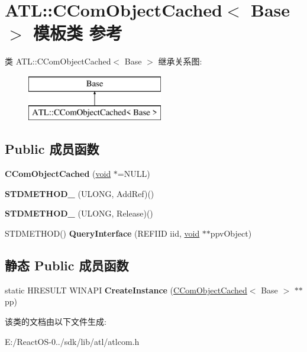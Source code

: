 \hypertarget{class_a_t_l_1_1_c_com_object_cached}{}\section{A\+TL\+:\+:C\+Com\+Object\+Cached$<$ Base $>$ 模板类 参考}
\label{class_a_t_l_1_1_c_com_object_cached}
类 A\+TL\+:\+:C\+Com\+Object\+Cached$<$ Base $>$ 继承关系图\+:\begin{figure}[H]
\begin{center}
\leavevmode
\includegraphics[height=2.000000cm]{class_a_t_l_1_1_c_com_object_cached}
\end{center}
\end{figure}
\subsection*{Public 成员函数}
\begin{DoxyCompactItemize}
\item 
\mbox{\label{class_a_t_l_1_1_c_com_object_cached_ab1a135fc4223e9664c22537138d6c3f1}} 
{\bfseries C\+Com\+Object\+Cached} (\hyperlink{interfacevoid}{void} $\ast$=N\+U\+LL)
\item 
\mbox{\label{class_a_t_l_1_1_c_com_object_cached_a58f352e490691bca9d028a63a22572ce}} 
{\bfseries S\+T\+D\+M\+E\+T\+H\+O\+D\+\_\+} (U\+L\+O\+NG, Add\+Ref)()
\item 
\mbox{\label{class_a_t_l_1_1_c_com_object_cached_ae89000d8a31f0e179b44484a43d38dfb}} 
{\bfseries S\+T\+D\+M\+E\+T\+H\+O\+D\+\_\+} (U\+L\+O\+NG, Release)()
\item 
\mbox{\label{class_a_t_l_1_1_c_com_object_cached_af9397caafce8428e720c1c25bd14fc8b}} 
S\+T\+D\+M\+E\+T\+H\+OD() {\bfseries Query\+Interface} (R\+E\+F\+I\+ID iid, \hyperlink{interfacevoid}{void} $\ast$$\ast$ppv\+Object)
\end{DoxyCompactItemize}
\subsection*{静态 Public 成员函数}
\begin{DoxyCompactItemize}
\item 
\mbox{\label{class_a_t_l_1_1_c_com_object_cached_a2d4edf91fe275ca6bafb6a1d0f646ef4}} 
static H\+R\+E\+S\+U\+LT W\+I\+N\+A\+PI {\bfseries Create\+Instance} (\hyperlink{class_a_t_l_1_1_c_com_object_cached}{C\+Com\+Object\+Cached}$<$ Base $>$ $\ast$$\ast$pp)
\end{DoxyCompactItemize}


该类的文档由以下文件生成\+:\begin{DoxyCompactItemize}
\item 
E\+:/\+React\+O\+S-\/0../sdk/lib/atl/atlcom.\+h\end{DoxyCompactItemize}
